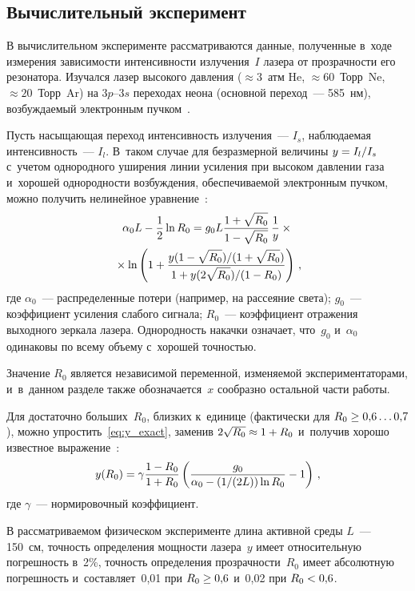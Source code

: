 \begin{multicols}{2}
\section{Вычислительный эксперимент}

В вычислительном эксперименте рассматриваются данные, полученные в~ходе 
измерения зависимости интенсивности излучения~$I$ лазера от прозрачности его резонатора.
Изучался лазер высокого давления ($\approx 3$~атм He, $\approx 60$~Торр\ Ne, 
$\approx 20$~Торр\ Ar) на
$3p$--$3s$ переходах неона (основной переход~--- 585~нм), возбуждаемый электронным 
пучком~\cite{alexandrov1991kinetics}.

Пусть насыщающая переход интенсивность излуче\-ния~--- $I_s$, наблюдаемая 
интенсивность~--- $I_l$. В~таком случае для безразмерной величины 
$y \hm= {I_l}/{I_s}$ с~учетом  однородного
уширения линии усиле\-ния при высоком давлении газа и~хорошей однородности 
возбуждения, обеспечиваемой электронным пучком, можно получить нелинейное 
уравнение~\cite{champagne1982transient}:
\begin{multline}
  \alpha_0 L - \displaystyle\frac{\displaystyle 1\mathstrut}{\displaystyle 2\mathstrut} \ln R_0 = g_0 L \displaystyle\frac{\displaystyle 1 + \sqrt{R_0}\mathstrut}{\displaystyle 1 - \sqrt{R_0}\mathstrut} \,
\displaystyle\frac{\displaystyle 1\mathstrut}{\displaystyle y\mathstrut} \times{}
\\
{}\times \ln \left( 1 + \displaystyle\frac{\displaystyle y ({1 - \sqrt{R_0}})/({1 + \sqrt{R_0}})\mathstrut}{\displaystyle 1 + y 
({2 \sqrt{R_0}})/({1 - R_0})\mathstrut} \right)\,,
  \label{eq:y_exact}
\end{multline}
где $\alpha_0$~--- распределенные потери (например, на рассеяние света);
$g_0$~--- коэффициент усиления слабого сигнала; $R_0$~--- коэффициент отражения 
выходного зеркала лазера. Однородность накачки означает, что~$g_0$ 
и~$\alpha_0$ одинаковы  по всему объему с~хорошей точностью.

Значение $R_0$ является независимой переменной, изменяемой экспериментаторами, 
и~в~данном разделе также обозначается~$x$ сообразно остальной части работы.

Для достаточно больших~$R_0$, близких к~единице (фактически для 
$R_0 \hm\geq 0{,}6\ldots0{,}7$),
можно упрос\-тить~\eqref{eq:y_exact}, заменив $2 \sqrt{R_0} \hm\approx 1 \hm+ R_0$ 
и~получив хорошо известное выражение~\cite{champagne1982transient}:
\begin{equation}
  y(R_0) = \gamma \displaystyle\frac{\displaystyle 1 - R_0\mathstrut}{\displaystyle 1 + R_0\mathstrut} \left(\displaystyle\frac{\displaystyle g_0\mathstrut}{\displaystyle \alpha_0 - 
({1}/({2L})) \ln R_0\mathstrut} - 1\right)\,,
  \label{eq:y_approx}
\end{equation}
где $\gamma$~--- нормировочный коэффициент.

В рассматриваемом физическом эксперименте длина активной среды $L$~--- 150~см,
точность определения мощности лазера~$y$ имеет
относительную погрешность в~2\%, точ\-ность определения прозрачности~$R_0$ имеет
абсолютную погрешность и~со\-став\-ля\-ет~0,01 при $R_0 \hm\geq 0{,}6$ и~0,02 при $R_0  \hm< 0{,}6$. 


\end{multicols}
